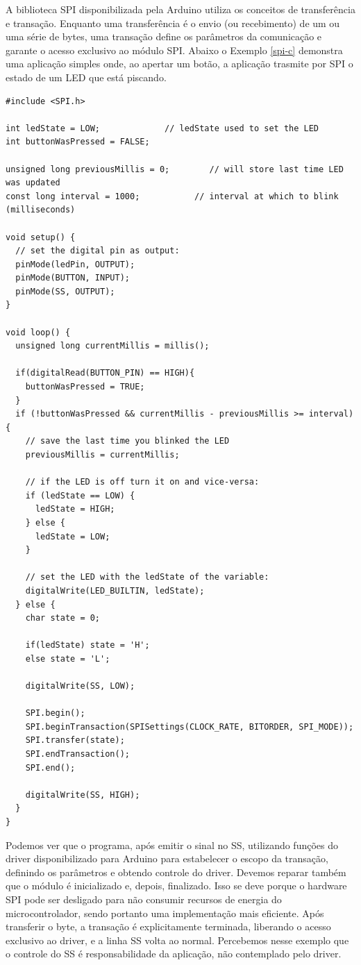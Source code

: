 \documentclass[11pt]{article}
\begin{document}
\par A biblioteca SPI disponibilizada pela Arduino utiliza os conceitos de transferência e transação. Enquanto uma transferência é o envio (ou recebimento) de um ou uma série de bytes, uma transação define os parâmetros da comunicação e garante o acesso exclusivo ao módulo SPI. Abaixo o Exemplo \ref{spi-c} demonstra uma aplicação simples onde, ao apertar um botão, a aplicação trasmite por SPI o estado de um LED que está piscando.
\begin{lstlisting}[style=CStyle,label=spi-c,caption=Aplicação em C utilizando driver SPI bloqueante]
#include <SPI.h>

int ledState = LOW;             // ledState used to set the LED
int buttonWasPressed = FALSE;

unsigned long previousMillis = 0;        // will store last time LED was updated
const long interval = 1000;           // interval at which to blink (milliseconds)

void setup() {
  // set the digital pin as output:
  pinMode(ledPin, OUTPUT);
  pinMode(BUTTON, INPUT);
  pinMode(SS, OUTPUT);
}

void loop() {
  unsigned long currentMillis = millis();

  if(digitalRead(BUTTON_PIN) == HIGH){
    buttonWasPressed = TRUE;
  }
  if (!buttonWasPressed && currentMillis - previousMillis >= interval) {
    // save the last time you blinked the LED
    previousMillis = currentMillis;

    // if the LED is off turn it on and vice-versa:
    if (ledState == LOW) {
      ledState = HIGH;
    } else {
      ledState = LOW;
    }

    // set the LED with the ledState of the variable:
    digitalWrite(LED_BUILTIN, ledState);
  } else {
    char state = 0;

    if(ledState) state = 'H';
    else state = 'L';

    digitalWrite(SS, LOW);

    SPI.begin();
    SPI.beginTransaction(SPISettings(CLOCK_RATE, BITORDER, SPI_MODE));
    SPI.transfer(state);
    SPI.endTransaction();
    SPI.end();

    digitalWrite(SS, HIGH);
  }
}
\end{lstlisting}
\par Podemos ver que o programa, após emitir o sinal no SS, utilizando funções do driver disponibilizado para Arduino para estabelecer o escopo da transação, definindo os parâmetros e obtendo controle do driver. Devemos reparar também que o módulo é inicializado e, depois, finalizado. Isso se deve porque o hardware SPI pode ser desligado para não consumir recursos de energia do microcontrolador, sendo portanto uma implementação mais eficiente. Após transferir o byte, a transação é explicitamente terminada, liberando o acesso exclusivo ao driver, e a linha SS volta ao normal. Percebemos nesse exemplo que o controle do SS é responsabilidade da aplicação, não contemplado pelo driver.
\end{document}

